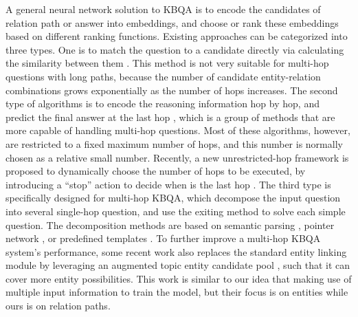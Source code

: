 A general neural network solution to KBQA is to encode the candidates of relation path or answer into embeddings, and choose or rank these embeddings based on different ranking functions. Existing approaches can be categorized into three types. One is to match the question to a candidate directly via calculating the similarity between them \cite{DBLP:journals/corr/abs-1801-09893,DBLP:conf/adbis/YuHYZW18}. This method is not very suitable for multi-hop questions with long paths, because the number of candidate entity-relation combinations grows exponentially as the number of hops increases. The second type of algorithms is to encode the reasoning information hop by hop, and predict the final answer at the last hop \cite{DBLP:conf/emnlp/MillerFDKBW16,DBLP:conf/coling/ZhouHZ18}, which is a group of methods that are more capable of handling multi-hop questions. Most of these algorithms, however, are restricted to a fixed maximum number of hops, and this number is normally chosen as a relative small number. Recently, a new unrestricted-hop framework is proposed to dynamically choose the number of hops to be executed, by introducing a ``stop'' action to decide when is the last hop \cite{DBLP:conf/naacl/ChenCCNK19}. The third type is specifically designed for multi-hop KBQA, which decompose the input question into several single-hop question, and use the exiting method to solve each simple question. The decomposition methods are based on semantic parsing \cite{DBLP:conf/www/AbujabalYRW17,DBLP:conf/emnlp/LuoLLZ18}, pointer network \cite{DBLP:conf/acl/MinZZH19}, or predefined templates \cite{DBLP:journals/pvldb/ZhengYZC18,DBLP:journals/corr/abs-1807-09623}.  %
 To further improve a multi-hop KBQA system's performance, some recent work also replaces the standard entity linking module by leveraging an augmented topic entity candidate pool \cite{DBLP:conf/ijcai/LanW019}, such that it can cover more entity possibilities. This work is similar to our idea that making use of multiple input information to train the model, but their focus is on entities while ours is on relation paths.




